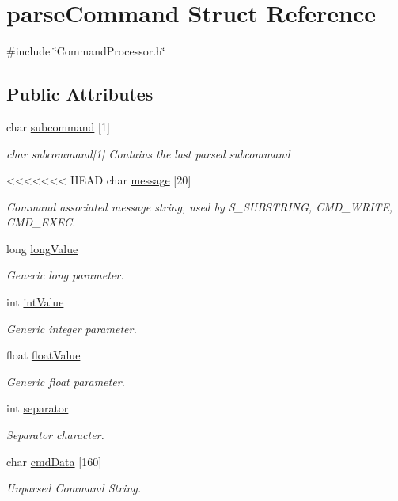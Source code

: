 \hypertarget{structparse_command}{\section{parse\-Command Struct Reference}
\label{structparse_command}
}


{\ttfamily \#include \char`\"{}Command\-Processor.\-h\char`\"{}}

\subsection*{Public Attributes}
\begin{DoxyCompactItemize}
\item 
char \hyperlink{structparse_command_a10312bf6b72a9315a4fb550458bc3ae9}{subcommand} \mbox{[}1\mbox{]}
\begin{DoxyCompactList}\small\item\em char subcommand\mbox{[}1\mbox{]} Contains the last parsed subcommand \end{DoxyCompactList}\item 
<<<<<<< HEAD
char \hyperlink{structparse_command_ab80399acc713a2d31a48dd2db5c7d0a2}{message} \mbox{[}20\mbox{]}
\begin{DoxyCompactList}\small\item\em Command associated message string, used by S\-\_\-\-S\-U\-B\-S\-T\-R\-I\-N\-G, C\-M\-D\-\_\-\-W\-R\-I\-T\-E, C\-M\-D\-\_\-\-E\-X\-E\-C. \end{DoxyCompactList}\item 
long \hyperlink{structparse_command_ad062df88615d7d66ded447dd4ff87bad}{long\-Value}
\begin{DoxyCompactList}\small\item\em Generic long parameter. \end{DoxyCompactList}\item 
int \hyperlink{structparse_command_a022bdea84dc5c07ff20af8690a1aa2e3}{int\-Value}
\begin{DoxyCompactList}\small\item\em Generic integer parameter. \end{DoxyCompactList}\item 
float \hyperlink{structparse_command_a121ded5fdf791ba216ad84cef651fe74}{float\-Value}
\begin{DoxyCompactList}\small\item\em Generic float parameter. \end{DoxyCompactList}\item 
int \hyperlink{structparse_command_a5f5c48be92f3aae7c4b1b71ca750298b}{separator}
\begin{DoxyCompactList}\small\item\em Separator character. \end{DoxyCompactList}\item 
char \hyperlink{structparse_command_a7cb5165cf18cc63d7eed9fa34be4efd8}{cmd\-Data} \mbox{[}160\mbox{]}
\begin{DoxyCompactList}\small\item\em Unparsed Command String. \end{DoxyCompactList}\end{DoxyCompactItemize}
